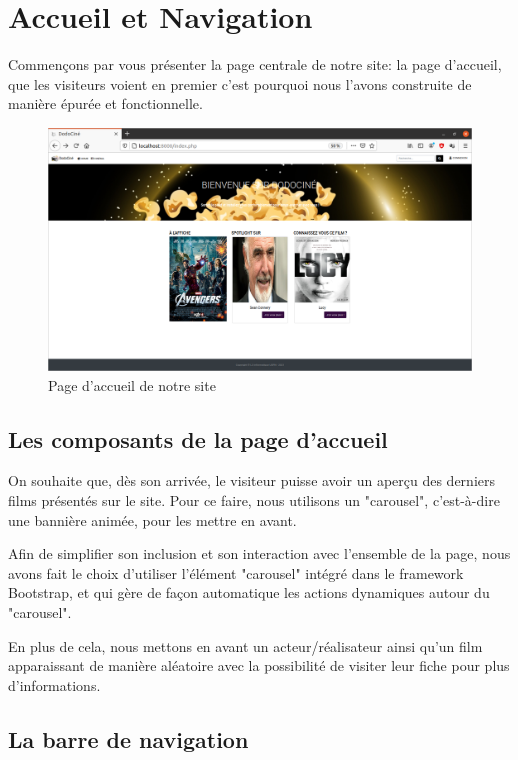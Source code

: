 \chapter{Accueil et Navigation}

    Commençons par vous présenter la page centrale de notre site: la page d'accueil, que les visiteurs voient en premier c'est pourquoi nous l'avons construite de manière épurée et fonctionnelle. 

    \medskip
    \begin{figure}[!ht]
        \centering
        \includegraphics[width=15cm]{img/page_accueil.png}
        \caption{Page d'accueil de notre site}
    \end{figure}

    \section{Les composants de la page d'accueil}
        
        On souhaite que, dès son arrivée, le visiteur puisse avoir un aperçu des derniers films présentés sur le site. Pour ce faire, nous utilisons un "carousel", c'est-à-dire une bannière animée, pour les mettre en avant. 

        Afin de simplifier son inclusion et son interaction avec l'ensemble de la page, nous avons fait le choix d'utiliser l'élément "carousel" intégré dans le framework Bootstrap, et qui gère de façon automatique les actions dynamiques autour du "carousel".

        \medskip
        En plus de cela, nous mettons en avant un acteur/réalisateur ainsi qu'un film apparaissant de manière aléatoire avec la possibilité de visiter leur fiche pour plus d'informations.


    \section{La barre de navigation}

